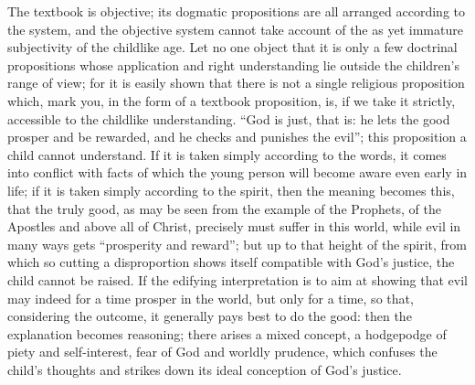 \documentclass[12pt,a4paper,openany]{book}
\newcommand{\opage}[1]{\marginnote{\footnotesize\textit{[#1]}}}
\begin{document}
The textbook is objective; its dogmatic propositions
are all arranged according to the system, and the objective system
cannot take account of the as yet immature
subjectivity of the childlike age. Let no one object that it is only
a few doctrinal propositions whose application and right understanding
lie outside the children's range of view; for it is easily
shown that there is not a single religious proposition
which, mark you, in the form of a textbook proposition, is, if
we take it strictly, accessible to the childlike understanding.
``God is just, that is: he lets the good
prosper and be rewarded, and he checks and punishes the
evil''; this proposition a child cannot understand. If it is
taken simply according to the words, it comes into conflict
with facts of which the young person will become aware even early
in life; if it is taken simply according to the spirit,
then the meaning becomes this, that the truly good,
\setcounter{footnote}{0}%
\opage{315}as may be seen from the example of the Prophets, of the Apostles and above
all of Christ, precisely must suffer in this world,
while evil in many ways gets ``prosperity
and reward''; but up to that height of the spirit,
from which so cutting a disproportion shows itself compatible
with God's justice, the child cannot be raised.
If the edifying interpretation is to aim at
showing that evil may indeed for a time prosper
in the world, but only for a time, so that, considering
the outcome, it generally pays best to
do the good: then the explanation becomes reasoning;
there arises a mixed concept, a hodgepodge of
piety and self-interest, fear of God and worldly prudence,
which confuses the child's thoughts and strikes down its ideal
conception of God's justice.
\end{document}
